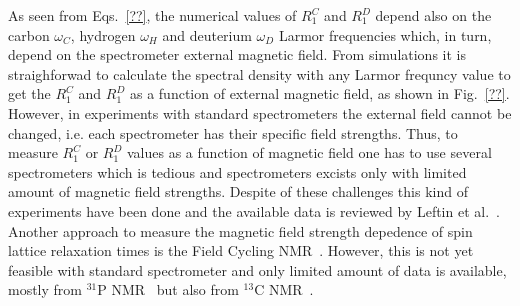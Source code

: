 \documentclass[aps,prl,superscriptaddress,twocolumn]{revtex4}
\begin{document}
As seen from Eqs.~\ref{??}, the numerical values of $R_1^{C}$ and $R_1^{D}$ depend also on the carbon $\omega_C$, hydrogen $\omega_H$ and
deuterium $\omega_D$ Larmor frequencies which, in turn, depend on the spectrometer external magnetic field.
From simulations it is straighforwad to calculate the spectral density with any Larmor frequncy value to get
the $R_1^{C}$ and $R_1^{D}$ as a function of external magnetic field, as shown in Fig.~\ref{??}.
However, in experiments with standard spectrometers the external field cannot be changed, i.e. each 
spectrometer has their specific field strengths. Thus, to measure $R_1^{C}$ or $R_1^{D}$ values as
a function of magnetic field one has to use several spectrometers which is tedious and spectrometers
excists only with limited amount of magnetic field strengths. Despite of these challenges this kind 
of experiments have been done and the available data is reviewed by Leftin et al.~\cite{leftin11}.
Another approach to measure the magnetic field strength depedence of spin lattice relaxation times
is the Field Cycling NMR~\cite{roberts04a,roberts04b}. However, this is not yet feasible with standard spectrometer
and only limited amount of data is available, mostly from $^{31}$P NMR~\cite{roberts04a,roberts04b,roberts09}
but also from $^{13}$C NMR~\cite{sivanandam09}.
\end{document}
